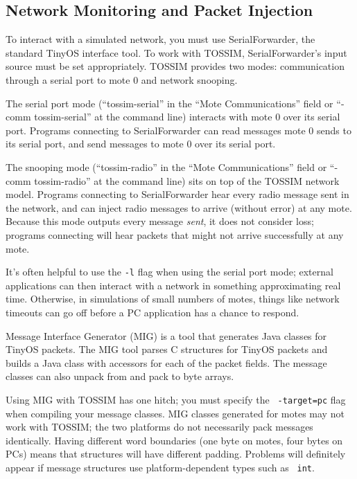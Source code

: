 \documentclass[10pt,fleqn]{article}
\def\sim{TOSSIM\xspace}
\begin{document}
\subsection{Network Monitoring and Packet Injection}

To interact with a simulated network, you must use SerialForwarder,
the standard TinyOS interface tool. To work with \sim,
SerialForwarder's input source must be set appropriately. \sim
provides two modes: communication through a serial port to mote 0
and network snooping.

The serial port mode (``tossim-serial'' in the ``Mote Communications''
field or ``-comm tossim-serial'' at the command line) interacts with mote 0
over its serial port. Programs connecting to SerialForwarder can read
messages mote 0 sends to its serial port, and send messages to mote 0 over
its serial port.

The snooping mode (``tossim-radio'' in the ``Mote Communications'' field
or ``-comm tossim-radio'' at the command line) sits on top of the \sim
network model. Programs connecting to SerialForwarder hear every radio
message sent in the network, and can inject radio messages to arrive
(without error) at any mote. Because this mode outputs every message {\it
sent}, it does not consider loss; programs connecting will hear packets
that might not arrive successfully at any mote.

It's often helpful to use the {\tt -l} flag when using the serial port
mode; external applications can then interact with a network in
something approximating real time. Otherwise, in simulations of small
numbers of motes, things like network timeouts can go off before a PC
application has a chance to respond.

Message Interface Generator (MIG) is a tool that generates Java
classes for TinyOS packets. The MIG tool parses C structures for
TinyOS packets and builds a Java class with accessors for each of the
packet fields. The message classes can also unpack from and pack to
byte arrays.

Using MIG with \sim has one hitch; you must specify the {\tt
-target=pc} flag when compiling your message classes. MIG classes
generated for motes may not work with \sim; the two platforms do not
necessarily pack messages identically. Having different word
boundaries (one byte on motes, four bytes on PCs) means that
structures will have different padding. Problems will definitely
appear if message structures use platform-dependent types such as {\tt
int}. 
\end{document}
